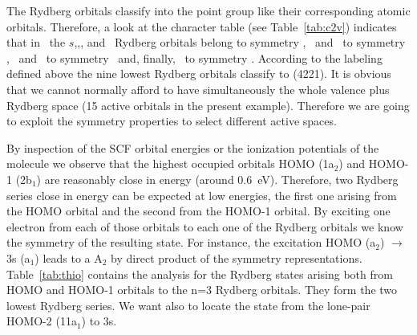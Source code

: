 The Rydberg orbitals classify into the point group like their corresponding
atomic orbitals. Therefore, a look at the character table 
(see Table~\ref{tab:c2v}) indicates that in \Ctv\ the $s$,\pz,\dzt,
and \dxtyt\ Rydberg orbitals belong to symmetry \ao, \px\ and \dxz\ to symmetry
\bo, \py\ and \dyz\ to symmetry \bt\ and, finally, \dxy\ to
symmetry \at. According to the labeling defined above the nine lowest Rydberg
orbitals classify to (4221). It is obvious that we cannot normally
afford to have simultaneously the whole valence plus Rydberg space
(15 active orbitals in the present example). Therefore we are going to
exploit the symmetry properties to select different active spaces.


By inspection of the SCF orbital energies or the ionization
potentials of the molecule we observe that the highest occupied
orbitals HOMO (1a$_2$) and HOMO-1 (2b$_1$) are reasonably close in
energy (around 0.6~eV). Therefore, two Rydberg series close in energy 
can be expected at low energies, the first one arising from the
HOMO orbital and the second from the \mbox{HOMO-1} orbital. By exciting
one electron from each of those orbitals to each one of the 
Rydberg orbitals we know the symmetry of the resulting state.
For instance, the excitation HOMO (a$_2$) $\to$ 3s (a$_1$) leads
to a A$_2$ by direct product of the symmetry representations.
Table~\ref{tab:thio} contains the analysis for the Rydberg states
arising both from HOMO and HOMO-1 orbitals to the n=3 Rydberg
orbitals. They form the two lowest Rydberg series. We want also
to locate the state from the lone-pair HOMO-2 (11a$_1$) to 3s.
%
